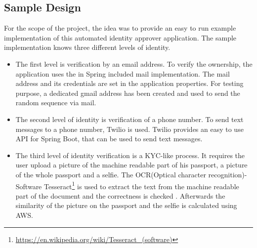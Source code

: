 \subsection{Sample Design}
For the scope of the project, the idea was to provide an easy to run example implementation of this automated identity approver application. The sample implementation knows three different levels of identity.

\begin{itemize}
    \item The first level is verification by an email address. To verify the ownership, the application uses the in Spring included mail implementation. The mail address and its credentials are set in the application properties. For testing purpose, a dedicated gmail address has been created and used to send the random sequence via mail.
    
    \item The second level of identity is verification of a phone number. To send text messages to a phone number, Twilio is used. Twilio provides an easy to use API for Spring Boot, that can be used to send text messages. 
    
    \item The third level of identity verification is a KYC-like process. It requires the user upload a picture of the machine readable part of his passport, a picture of the whole passport and a selfie. The OCR(Optical character recognition)-Software Tesseract\footnote{\url{https://en.wikipedia.org/wiki/Tesseract_(software)}} is used to extract the text from the machine readable part of the document and the correctness is checked . Afterwards the similarity of the picture on the passport and the selfie is calculated using AWS. 
\end{itemize}




